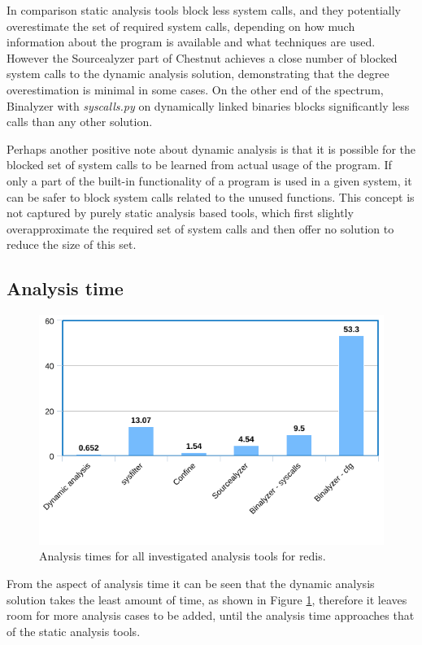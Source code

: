 In comparison static analysis tools block less system calls, and they potentially overestimate the set of required system calls, depending on how much information about the program is available and what techniques are used.
However the Sourcealyzer part of Chestnut achieves a close number of blocked system calls to the dynamic analysis solution, demonstrating that the degree overestimation is minimal in some cases.
On the other end of the spectrum, Binalyzer with \textit{syscalls.py} on dynamically linked binaries blocks significantly less calls than any other solution.

Perhaps another positive note about dynamic analysis is that it is possible for the blocked set of system calls to be learned from actual usage of the program. If only a part of the built-in functionality of a program is used in a given system, it can be safer to block system calls related to the unused functions. This concept is not captured by purely static analysis based tools, which first slightly overapproximate the required set of system calls and then offer no solution to reduce the size of this set.

\subsection {Analysis time}
\begin{figure}
    \centering
    \includegraphics[width=\columnwidth]{./chart_timings.png}
    \caption{Analysis times for all investigated analysis tools for redis.}
    \label{fig:timings}
\end{figure}
From the aspect of analysis time it can be seen that the dynamic analysis solution takes the least amount of time, as shown in Figure \ref{fig:timings}, therefore it leaves room for more analysis cases to be added, until the analysis time approaches that of the static analysis tools.

